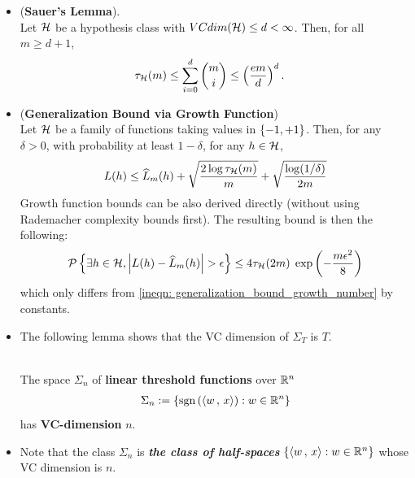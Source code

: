 \documentclass[11pt]{article}
\begin{document}
\begin{itemize}
\item \begin{lemma} (\textbf{Sauer's Lemma}). \citep{shalev2014understanding, mohri2018foundations}\\
Let ${\mathcal H}$ be a hypothesis class with $VCdim({\mathcal H}) \le d < \infty$. Then, for all $m \ge d + 1$, 
\begin{align}
\tau_{{\mathcal H}}(m) &\le \sum_{i=0}^{d}{{m}\choose{i}} \le \left(\frac{em}{d}\right)^{d}.  \label{eqn: sauer_lemma}
\end{align}
\end{lemma}

\item 
\begin{proposition} \label{cor: generalization_bound_growth}   (\textbf{Generalization Bound via Growth Function})  \citep{mohri2018foundations}\\
Let ${\mathcal H}$ be a family of functions taking values in $\left\{-1, +1\right\}$.  Then, for any $\delta > 0$, with probability at least $1 - \delta$, for any $h \in {\mathcal H}$,
\begin{align}
L(h) \le \widehat{L}_{m}(h) + \sqrt{\frac{2 \log \tau_{{\mathcal H}}(m)}{m}} +\sqrt{\frac{\log(1/\delta)}{2m}} \label{ineqn: generalization_bound_growth_number}
\end{align}
Growth function bounds can be also derived directly (without using Rademacher complexity bounds first). The resulting bound is then the following:
\begin{align}
{\mathcal P}\left\{\exists h\in {\mathcal H}, \left\lvert L(h) - \widehat{L}_{m}(h) \right\rvert > \epsilon \right\}  \le 4\tau_{{\mathcal H}}(2m)\;\exp\left(-\frac{m\epsilon^2}{8}\right) \label{ineqn: generalization_bound_growth_number_2}
\end{align}
which only differs from \eqref{ineqn: generalization_bound_growth_number} by constants.
\end{proposition}



\item The following lemma shows that the VC dimension of $\Sigma_T$ is $T$.
\begin{lemma} \citep{schapire2012boosting, mohri2018foundations}\\
The space $\Sigma_n$ of \textbf{linear threshold functions} over ${\mathbb R}^n$ 
\begin{align*}
\Sigma_n := \left\{\text{sgn}\left(\left\langle w\,,\, x \right\rangle\right):  w \in {\mathbb R}^n\right\}
\end{align*}
has \textbf{VC-dimension} $n$.
\end{lemma}

\item \begin{remark}
Note that the class $\Sigma_n$ is  \textbf{\emph{the class of half-spaces}} $\{\left\langle w\,,\, x \right\rangle: w \in {\mathbb R}^n\}$ whose VC dimension is $n$. 
\end{remark}


\end{itemize}
\end{document}
